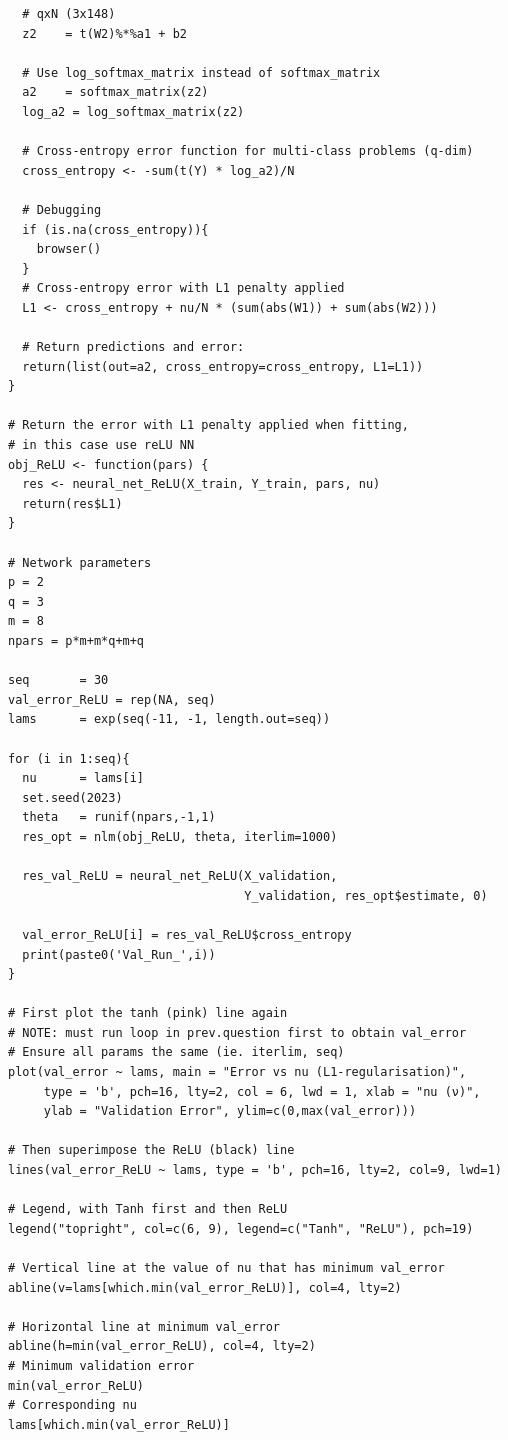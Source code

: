 \documentclass[12pt]{article}
\begin{document}
\begin{lstlisting}
  # qxN (3x148)        
  z2    = t(W2)%*%a1 + b2
  
  # Use log_softmax_matrix instead of softmax_matrix
  a2    = softmax_matrix(z2)
  log_a2 = log_softmax_matrix(z2)
  
  # Cross-entropy error function for multi-class problems (q-dim)
  cross_entropy <- -sum(t(Y) * log_a2)/N
  
  # Debugging
  if (is.na(cross_entropy)){
    browser()
  }
  # Cross-entropy error with L1 penalty applied
  L1 <- cross_entropy + nu/N * (sum(abs(W1)) + sum(abs(W2)))
  
  # Return predictions and error:
  return(list(out=a2, cross_entropy=cross_entropy, L1=L1))
}

# Return the error with L1 penalty applied when fitting,
# in this case use reLU NN
obj_ReLU <- function(pars) {
  res <- neural_net_ReLU(X_train, Y_train, pars, nu)
  return(res$L1)
}

# Network parameters
p = 2
q = 3
m = 8
npars = p*m+m*q+m+q

seq       = 30
val_error_ReLU = rep(NA, seq)
lams      = exp(seq(-11, -1, length.out=seq))

for (i in 1:seq){
  nu      = lams[i]
  set.seed(2023)
  theta   = runif(npars,-1,1)
  res_opt = nlm(obj_ReLU, theta, iterlim=1000)
  
  res_val_ReLU = neural_net_ReLU(X_validation, 
                                 Y_validation, res_opt$estimate, 0) 
  
  val_error_ReLU[i] = res_val_ReLU$cross_entropy
  print(paste0('Val_Run_',i))
}

# First plot the tanh (pink) line again 
# NOTE: must run loop in prev.question first to obtain val_error 
# Ensure all params the same (ie. iterlim, seq)
plot(val_error ~ lams, main = "Error vs nu (L1-regularisation)", 
     type = 'b', pch=16, lty=2, col = 6, lwd = 1, xlab = "nu (ν)", 
     ylab = "Validation Error", ylim=c(0,max(val_error)))

# Then superimpose the ReLU (black) line
lines(val_error_ReLU ~ lams, type = 'b', pch=16, lty=2, col=9, lwd=1)

# Legend, with Tanh first and then ReLU
legend("topright", col=c(6, 9), legend=c("Tanh", "ReLU"), pch=19)

# Vertical line at the value of nu that has minimum val_error
abline(v=lams[which.min(val_error_ReLU)], col=4, lty=2)

# Horizontal line at minimum val_error
abline(h=min(val_error_ReLU), col=4, lty=2)
# Minimum validation error
min(val_error_ReLU)
# Corresponding nu
lams[which.min(val_error_ReLU)]



\end{lstlisting}
\end{document}

